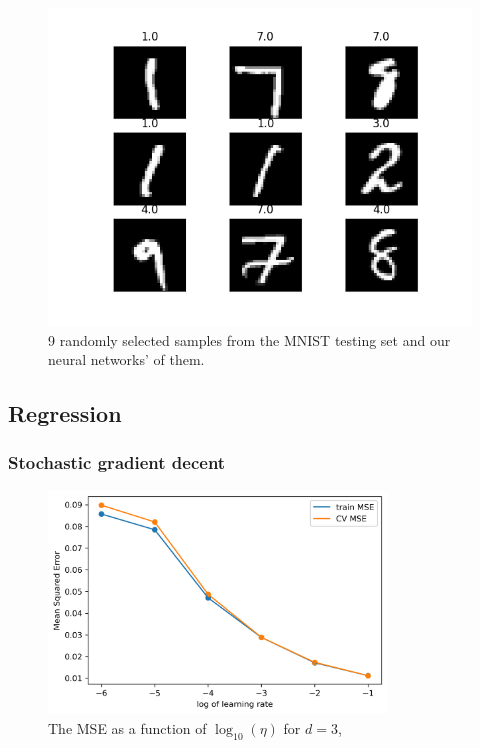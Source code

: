 \documentclass[../main.tex]{subfiles}
\begin{document}
\begin{figure}[h!]
    \centering
    \includegraphics[width=\textwidth]{doc/assets/nn_sigmoid_mnist_plot.png}
    \caption{9 randomly selected samples from the MNIST testing set and our neural networks' of them.}
    \label{fig:mnist_predictions}
\end{figure}

\subsection{Regression}
\subsubsection{Stochastic gradient decent}
\begin{figure}[htb]
    \centering
    \includegraphics[width=0.8\textwidth]{../assets/etas_vs_mse.png}
    \caption{The MSE as a function of $\log_{10}(\eta)$ for $d=3$, }
    \label{fig:etas_vs_mse}
\end{figure}
\end{document}
